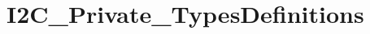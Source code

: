 \hypertarget{group___i2_c___private___types_definitions}{}\section{I2\+C\+\_\+\+Private\+\_\+\+Types\+Definitions}
\label{group___i2_c___private___types_definitions}
